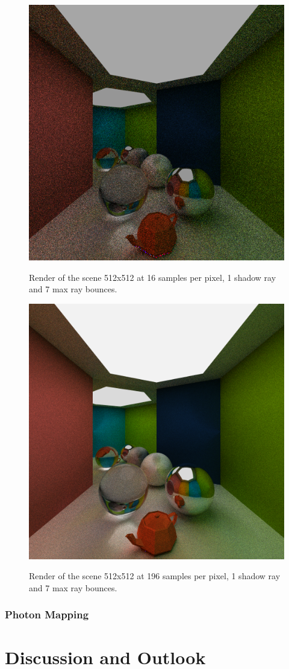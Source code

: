 \documentclass[a4paper, twocolumn]{article}
\begin{document}
            \begin{figure}[H]
                \centering
                \caption{Render of the scene 512x512 at 16 samples per pixel, 1 shadow ray and 7 max ray bounces.}
                \includegraphics[width=0.8\linewidth]{share/results/supersamples_16.png}
                \label{fig:supersamples_16}
            \end{figure}

            \begin{figure}[H]
                \centering
                \caption{Render of the scene 512x512 at 196 samples per pixel, 1 shadow ray and 7 max ray bounces.}
                \includegraphics[width=0.8\linewidth]{share/results/supersamples_196.png}
                \label{fig:supersamples_192}
            \end{figure}

            \subsubsection*{Photon Mapping}

    \section{Discussion and Outlook} \label{sec:discussion_and_outlook}

    \newpage %
    \nocite{*} %
    
    
\end{document}
